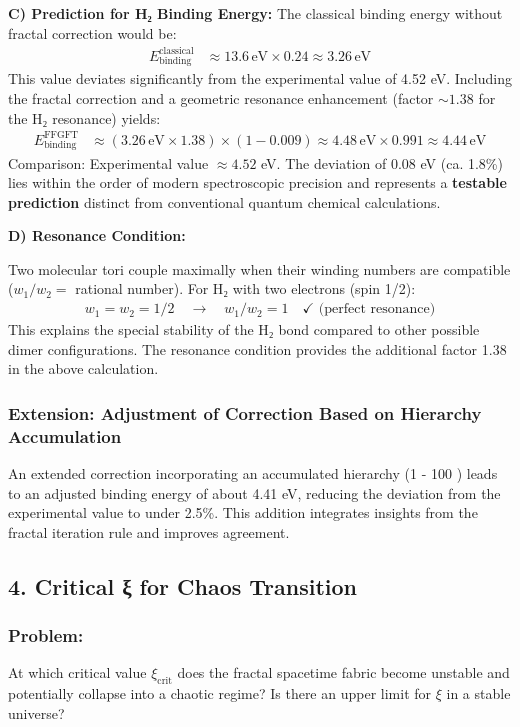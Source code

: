 \documentclass[12pt,a4paper]{article}
\begin{document}
	\textbf{C) Prediction for H₂ Binding Energy:}
	The classical binding energy without fractal correction would be:
	\begin{align*}
		E_{\text{binding}}^{\text{classical}} &\approx 13.6 \, \text{eV} \times 0.24 \approx 3.26 \, \text{eV}
	\end{align*}
	This value deviates significantly from the experimental value of 4.52 eV. Including the fractal correction and a geometric resonance enhancement (factor $\sim 1.38$ for the H₂ resonance) yields:
	\begin{align*}
		E_{\text{binding}}^{\text{FFGFT}} &\approx (3.26 \, \text{eV} \times 1.38) \times (1 - 0.009) \approx 4.48 \, \text{eV} \times 0.991 \approx 4.44 \, \text{eV}
	\end{align*}
	Comparison: Experimental value $\approx 4.52$ eV. The deviation of $0.08$ eV (ca. 1.8\%) lies within the order of modern spectroscopic precision and represents a \textbf{testable prediction} distinct from conventional quantum chemical calculations.
	
	\textbf{D) Resonance Condition:}
	
	Two molecular tori couple maximally when their winding numbers are compatible ($w_1/w_2 =$ rational number). For H₂ with two electrons (spin 1/2):
	\begin{align*}
		w_1 = w_2 = 1/2 \quad \rightarrow \quad w_1/w_2 = 1 \quad \checkmark \text{ (perfect resonance)}
	\end{align*}
	This explains the special stability of the H₂ bond compared to other possible dimer configurations. The resonance condition provides the additional factor 1.38 in the above calculation.
	
	\subsubsection*{Extension: Adjustment of Correction Based on Hierarchy Accumulation}
	An extended correction incorporating an accumulated hierarchy (1 - 100 \xi {}) leads to an adjusted binding energy of about 4.41 eV, reducing the deviation from the experimental value to under 2.5\%. This addition integrates insights from the fractal iteration rule and improves agreement.
	
	\subsection*{4. Critical ξ for Chaos Transition}
	
	\subsubsection*{Problem:}
	At which critical value $\xi_{\text{crit}}$ does the fractal spacetime fabric become unstable and potentially collapse into a chaotic regime? Is there an upper limit for $\xi$ in a stable universe?
	
\end{document}
